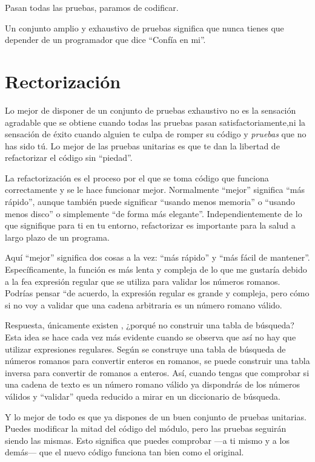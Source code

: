 Pasan todas las pruebas, paramos de codificar.

Un conjunto amplio y exhaustivo de pruebas significa que nunca tienes que depender de un programador que dice ``Confía en mi''.

\section{Rectorización}

Lo mejor de disponer de un conjunto de pruebas exhaustivo no es la sensación agradable que se obtiene cuando todas las pruebas pasan satisfactoriamente,ni la sensación de éxito cuando alguien te culpa de romper su código y \emph{pruebas} que no has sido tú. Lo mejor de las pruebas unitarias es que te dan la libertad de refactorizar el código sin ``piedad''.

La refactorización es el proceso por el que se toma código que funciona correctamente y se le hace funcionar mejor. Normalmente ``mejor'' significa ``más rápido'', aunque también puede significar ``usando menos memoria'' o ``usando menos disco'' o simplemente ``de forma más elegante''. Independientemente de lo que signifique para ti en tu entorno, refactorizar es importante para la salud a largo plazo de un programa.

Aquí ``mejor'' significa dos cosas a la vez: ``más rápido'' y ``más fácil de mantener''. Específicamente, la función  es más lenta y compleja de lo que me gustaría debido a la fea expresión regular que se utiliza para validar los números romanos. Podrías pensar ``de acuerdo, la expresión regular es grande y compleja, pero cómo si no voy a validar que una cadena arbitraria es un número romano válido.

Respuesta, únicamente existen , ¿porqué no construir una tabla de búsqueda? Esta idea se hace cada vez más evidente cuando se observa que así no hay que utilizar expresiones regulares. Según se construye una tabla de búsqueda de números romanos para convertir enteros en romanos, se puede construir una tabla inversa para convertir de romanos a enteros. Así, cuando tengas que comprobar si una cadena de texto es un número romano válido ya dispondrás de los números válidos y ``validar'' queda reducido a mirar en un diccionario de búsqueda.

Y lo mejor de todo es que ya dispones de un buen conjunto de pruebas unitarias. Puedes modificar la mitad del código del módulo, pero las pruebas seguirán siendo las mismas. Esto significa que puedes comprobar ---a ti mismo y a los demás--- que el nuevo código funciona tan bien como el original.

